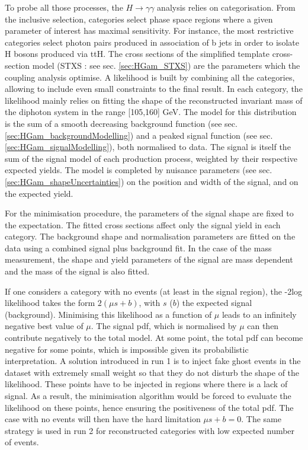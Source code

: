 To probe all those processes, the \(H\rightarrow \gamma\gamma\) analysis relies on categorisation.
From the inclusive selection, categories select phase space regions where a given parameter of interest has maximal sensitivity.
For instance, the most restrictive categories select photon pairs produced in association of b jets in order to isolate H bosons produced via ttH.
The cross sections of the simplified template cross-section model (STXS : see sec. \ref{sec:HGam_STXS}) are the parameters which the coupling analysis optimise.
A likelihood is built by combining all the categories, allowing to include even small constraints to the final result.
In each category, the likelihood mainly relies on fitting the shape of the reconstructed invariant mass of the diphoton system in the range [105,160] GeV.
The model for this distribution is the sum of  a smooth decreasing background function (see sec. \ref{sec:HGam_backgroundModelling}) and a peaked signal function (see sec. \ref{sec:HGam_signalModelling}), both normalised to data.
The signal is itself the sum of the signal model of each production process, weighted by their respective expected yields.
The model is completed by nuisance parameters (see sec. \ref{sec:HGam_shapeUncertainties}) on the position and width of the signal, and on the expected yield.

For the minimisation procedure, the parameters of the signal shape are fixed to the expectation.
The fitted cross sections affect only the signal yield in each category.
The background shape and normalisation parameters are fitted on the data using a combined signal plus background fit.
In the case of the mass measurement, the shape and yield parameters of the signal are mass dependent and the mass of the signal is also fitted.

If one considers a category with no events (at least in the signal region), the -2log likelihood takes the form $2(\mu s+b)$, with $s$ ($b$) the expected signal (background).
Minimising this likelihood as a function of $\mu$ leads to an infinitely negative best value of $\mu$.
The signal pdf, which is normalised by $\mu$ can then contribute negatively to the total model.
At some point, the total pdf can become negative for some points, which is impossible given its probabilistic interpretation.
A solution introduced in run 1 is to inject fake ghost events in the dataset with extremely small weight so that they do not disturb the shape of the likelihood.
These points have to be injected in regions where there is a lack of signal.
As a result, the minimisation algorithm would be forced to evaluate the likelihood on these points, hence ensuring the positiveness of the total pdf.
The case with no events will then have the hard limitation $\mu s+b=0$.
The same strategy is used in run 2 for reconstructed categories with low expected number of events.


